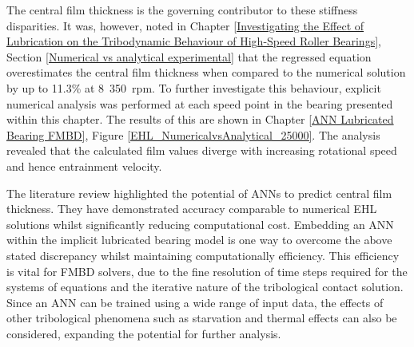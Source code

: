 The central film thickness is the governing contributor to these stiffness disparities. It was, however, noted in  Chapter \ref{Investigating the Effect of Lubrication on the Tribodynamic Behaviour of High-Speed Roller Bearings}, Section \ref{Numerical vs analytical experimental} that the regressed equation overestimates the central film thickness when compared to the numerical solution by up to 11.3\% at 8~350~rpm. To further investigate this behaviour, explicit numerical analysis was performed at each speed point in the bearing presented within this chapter. The results of this are shown in Chapter \ref{ANN Lubricated Bearing FMBD}, Figure \ref{EHL_NumericalvsAnalytical_25000}. The analysis revealed that the calculated film values diverge with increasing rotational speed and hence entrainment velocity.

The literature review highlighted the potential of ANNs to predict central film thickness. They have demonstrated accuracy comparable to numerical EHL solutions whilst significantly reducing computational cost. Embedding an ANN within the implicit lubricated bearing model is one way to overcome the above stated discrepancy whilst maintaining computationally efficiency. This efficiency is vital for FMBD solvers, due to the fine resolution of time steps required for the systems of equations and the iterative nature of the tribological contact solution. Since an ANN can be trained using a wide range of input data, the effects of other tribological phenomena such as starvation and thermal effects can also be considered, expanding the potential for further analysis.
 



